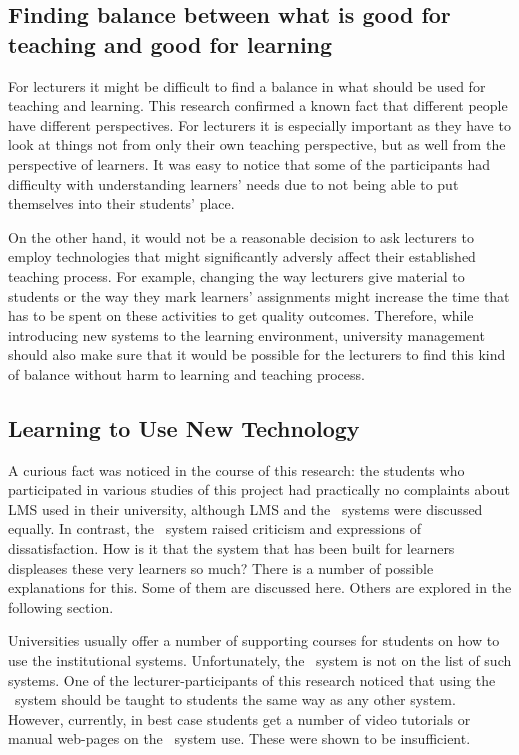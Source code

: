 \subsection[Finding Balance]{Finding balance between what is good for teaching
and good for learning}

For lecturers it might be difficult to find a balance in what should be used for
teaching and learning. This research confirmed a known fact that different
people have different perspectives. For lecturers it is especially important as
they have to look at things not from only their own teaching perspective, but as
well from the perspective of learners. It was easy to notice that some of the
participants had difficulty with understanding learners' needs due to not being
able to put themselves into their students' place.

On the other hand, it would not be a reasonable decision to ask lecturers to
employ technologies that might significantly adversly affect their established
teaching process. For example, changing the way lecturers give material to
students or the way they mark learners' assignments might increase the time that
has to be spent on these activities to get quality outcomes. Therefore, while
introducing new systems to the learning environment, university management
should also make sure that it would be possible for the lecturers to find this
kind of balance without harm to learning and teaching process.

\subsection{Learning to Use New Technology}

A curious fact was noticed in the course of this research: the students who
participated in various studies of this project had practically no complaints
about LMS used in their university, although LMS and the \ep~systems were
discussed equally. In contrast, the \ep~system raised criticism and expressions
of dissatisfaction. How is it that the system that has been built for learners
displeases these very learners so much? There is a number of possible
explanations for this. Some of them are discussed here. Others are explored in
the following section.

Universities usually offer a number of supporting courses for students on how to
use the institutional systems. Unfortunately, the \ep~system is not on the list
of such systems. One of the lecturer-participants of this research noticed that
using the \ep~system should be taught to students the same way as any other
system. However, currently, in best case students get a number of video tutorials
or manual web-pages on the \ep~system use. These were shown to be insufficient. 

